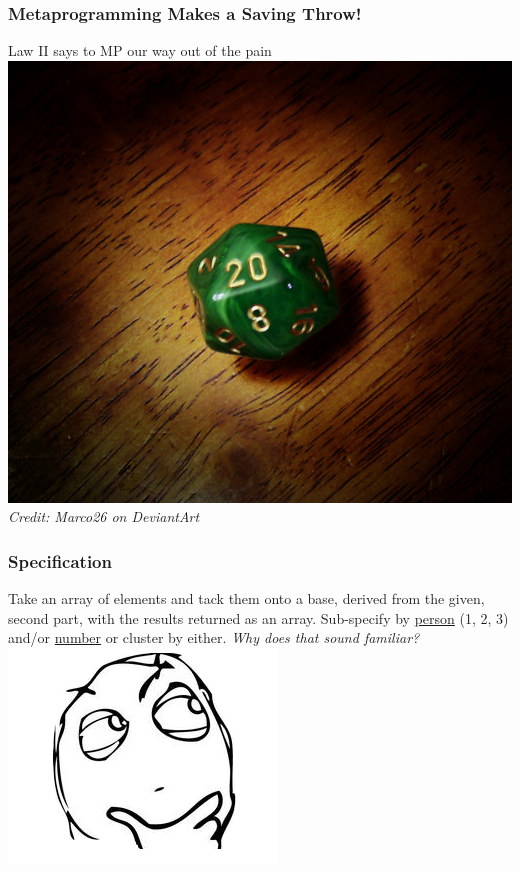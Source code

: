 \documentclass[slidestop,compress,mathserif]{beamer}
\begin{document}
\begin{frame}
	\frametitle{Metaprogramming Makes a Saving Throw!}
	\begin{center}
		Law II says to MP our way out of the pain
		\vskip 1.0cm
		\includegraphics[scale=0.25]{img/natural_20.jpg} \\
		\tiny
		\emph{Credit: Marco26 on DeviantArt}
		\normalsize
	\end{center}
\end{frame}

\begin{frame}
	\frametitle{Specification}
	Take an array of elements and tack them onto a base, derived from the given, second part, with the results returned as an array.  Sub-specify by \underline{person} (1, 2, 3) and/or \underline{number} or cluster by either.
	\pause
	\vskip 0.5cm
	\emph{Why does that sound familiar?}
	\vskip 0.5cm
	\includegraphics[scale=0.45]{img/determined.png}
\end{frame}
\end{document}
